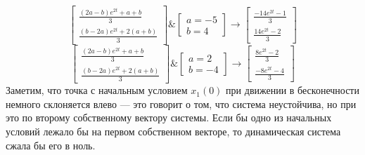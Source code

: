 \documentclass[a3paper,14pt]{extarticle}
\begin{document}
$$\begin{bmatrix}
    \frac{(2a-b)e^{2t}+a+b}{3} \\ \frac{(b-2a)e^{2t}+2(a+b)}{3}
\end{bmatrix} \& \begin{bmatrix}
    a=-5 \\b= 4
\end{bmatrix} \rightarrow \begin{bmatrix}
    \frac{-14e^{2t}-1}{3} \\ \frac{14e^{2t}-2}{3}
\end{bmatrix}$$
$$\begin{bmatrix}
    \frac{(2a-b)e^{2t}+a+b}{3} \\ \frac{(b-2a)e^{2t}+2(a+b)}{3}
\end{bmatrix} \& \begin{bmatrix}
    a=2 \\ b=-4
\end{bmatrix} \rightarrow \begin{bmatrix}
    \frac{8e^{2t}-2}{3} \\ \frac{-8e^{2t}-4}{3}
\end{bmatrix}$$
Заметим, что точка с начальным условием $x_1(0)$ при движении в бесконечности немного склоняется влево --- это говорит о том, что система неустойчива, но при это по второму собственному вектору системы. Если бы одно из начальных условий лежало бы на первом собственном векторе, то динамическая система сжала бы его в ноль.
\end{document}

